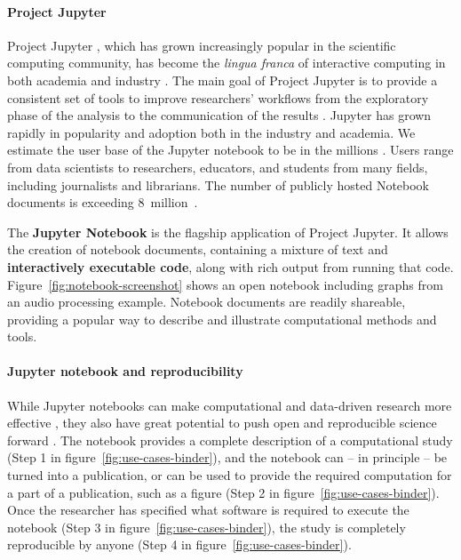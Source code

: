 \paragraph*{Project Jupyter}
\label{sec:project-jupyter}
Project Jupyter \cite{Jupyter}, which has grown increasingly popular in the scientific
computing community, has become the \emph{lingua franca} of interactive
computing in both academia and industry \cite{Perkel2018}. The main goal of Project Jupyter
is to provide a consistent set of tools to improve researchers'
workflows from the exploratory phase of the analysis to the communication
of the results \cite{Kluyver2016,Granger2021}.
Jupyter has grown rapidly in popularity and adoption both in the industry and academia.
We estimate the user base of the Jupyter notebook to be in the millions
\cite{jupyter-grant}. Users range from data scientists to researchers,
educators, and students from many fields, including journalists and librarians.
The number of publicly hosted Notebook documents is exceeding 8~million~\cite{notebookcount}.

The \textbf{Jupyter Notebook} is the flagship application of Project Jupyter.
It allows the creation of notebook documents, containing a mixture of text and
\textbf{interactively executable code}, along with rich output from running that code.
Figure~\ref{fig:notebook-screenshot} shows an open notebook including graphs
from an audio processing example. Notebook documents are readily shareable,
providing a popular way to describe and illustrate computational methods and
tools. 


\paragraph*{Jupyter notebook and reproducibility}
While Jupyter notebooks can make computational and data-driven research more effective
\cite{Perkel2018,Fangohr2020,Granger2021}, they also have great potential to push
open and reproducible science forward \cite{Beg2021}. The notebook provides a complete
description of a computational study (Step 1 in
figure~\ref{fig:use-cases-binder}), and the notebook can -- in principle -- be
turned into a publication, or can be used to provide the required computation
for a part of a publication, such as a figure (Step 2 in
figure~\ref{fig:use-cases-binder}). Once the researcher has specified what
software is required to execute the notebook (Step 3 in
figure~\ref{fig:use-cases-binder}), the study is completely reproducible by
anyone (Step 4 in figure~\ref{fig:use-cases-binder}).

